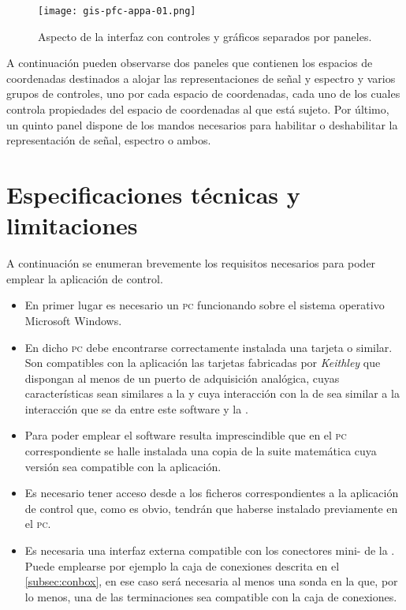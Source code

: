 \begin{figure}
	\begin{center}
		\texttt{[image: gis-pfc-appa-01.png]}
	\end{center}
	\caption[Aspecto de la interfaz de usuario]{Aspecto de la interfaz
	con controles y gráficos separados por paneles.}
	\label{fig:interface}
\end{figure}

A continuación pueden observarse dos paneles que contienen los espacios de
coordenadas destinados a alojar las representaciones de señal y espectro y
varios grupos de controles, uno por cada espacio de coordenadas, cada uno
de los cuales controla propiedades del espacio de coordenadas al que está
sujeto. Por último, un quinto panel dispone de los mandos necesarios para
habilitar o deshabilitar la representación de señal, espectro o ambos.


\section{Especificaciones técnicas y limitaciones}

A continuación se enumeran brevemente los requisitos necesarios para poder
emplear la aplicación de control.

\begin{itemize}
	\item En primer lugar es necesario un \textsc{pc} funcionando sobre
		el sistema operativo Microsoft Windows.
	\item En dicho \textsc{pc} debe encontrarse correctamente instalada
		una tarjeta \kpci{} o similar. Son compatibles con la
		aplicación las tarjetas fabricadas por \emph{Keithley} que
		dispongan al menos de un puerto de adquisición analógica,
		cuyas características sean similares a la \kpci{} y cuya
		interacción con la \datx{} de \matlab{} sea similar a la
		interacción que se da entre este software y la \kpci{}.
	\item Para poder emplear el software resulta imprescindible que en
		el \textsc{pc} correspondiente se halle instalada una copia
		de la suite matemática \matlab{} cuya versión sea
		compatible con la aplicación.
	\item Es necesario tener acceso desde \matlab{} a los ficheros
		correspondientes a la aplicación de control que, como es
		obvio, tendrán que haberse instalado previamente en el
		\textsc{pc}.
	\item Es necesaria una interfaz externa compatible con los
		conectores mini- de la \kpci{}. Puede emplearse por
		ejemplo la caja de conexiones descrita en el
		\vref{subsec:conbox}, en ese caso será necesaria al menos
		una sonda en la que, por lo menos, una de las terminaciones
		sea compatible con la caja de conexiones.
\end{itemize}


